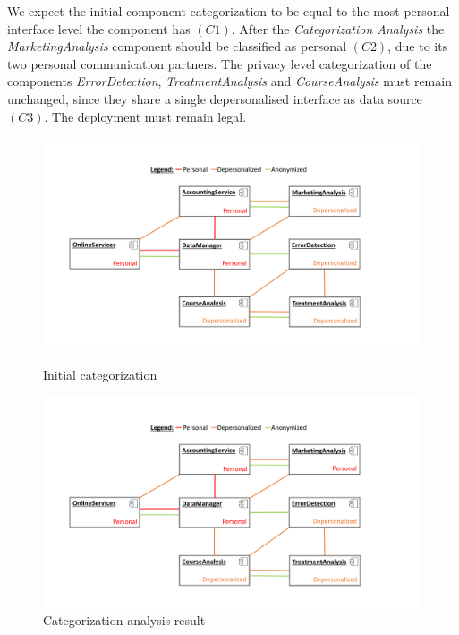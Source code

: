 We expect the initial component categorization to be equal to the most personal interface level the component has $(C1)$. After the \textit{Categorization Analysis} the \textit{MarketingAnalysis} component should be classified as personal $(C2)$, due to its two personal communication partners. The privacy level categorization of the components \textit{ErrorDetection}, \textit{TreatmentAnalysis} and \textit{CourseAnalysis} must remain unchanged, since they share a single depersonalised interface as data source $(C3)$. The deployment must remain legal.

\begin{figure}[h]
	\centering
	\begin{minipage}[b]{0.48\textwidth}		
		\includegraphics[trim = 20mm 10mm 40mm 10mm, clip, width=0.99\textwidth]{graphs/medSys_eval_pa_tagging_init}
		\caption{Initial categorization}
		\label{fig:eval:pa:base_tag}
	\end{minipage}
	\begin{minipage}[b]{0.48\textwidth}
		\includegraphics[trim = 20mm 10mm 40mm 10mm, clip, width=0.99\textwidth]{graphs/medSys_eval_pa_tagging_analysis}
		\caption{Categorization analysis result}
		\label{fig:eval:pa:categorized}
	\end{minipage}
\end{figure}

